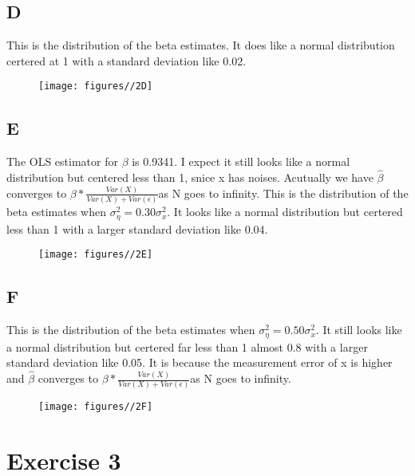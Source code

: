 \documentclass{report}
\begin{document}
\subsection{D}

This is the distribution of the beta estimates. It does like a normal distribution certered at 1 with a standard deviation like 0.02.

\begin{figure}[H]
        \centering 
         \texttt{[image: figures//2D]}
\end{figure}

\subsection{E}

The OLS estimator for $\beta$ is 0.9341. I expect it still looks like a normal distribution but centered less than 1, snice x has noises. Acutually we have 
$ \hat{\beta}$ converges to $\beta * \frac{Var(X)}{ Var(X)+Var(\epsilon)} $as N goes to infinity.
This is the distribution of the beta estimates when $ \sigma_{\eta}^{2} = 0.30\sigma_{x}^{2}$. It looks like a normal distribution but certered less than 1 with a larger standard deviation like 0.04.
 \begin{figure}[H]
        \centering 
         \texttt{[image: figures//2E]}
\end{figure}

\subsection{F}
This is the distribution of the beta estimates when $ \sigma_{\eta}^{2} = 0.50\sigma_{x}^{2}$. It still looks like a normal distribution but certered far less than 1 almost 0.8 with a larger standard deviation like 0.05. It is because the measurement error of x is higher and $ \hat{\beta}$ converges to $\beta * \frac{Var(X)}{ Var(X)+Var(\epsilon)} $as N goes to infinity.
 \begin{figure}[H]
        \centering 
         \texttt{[image: figures//2F]}
\end{figure}

\section{ Exercise 3}
\end{document}
